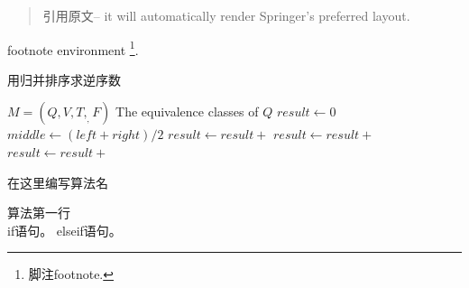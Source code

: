 \begin{quotation}
	引用原文-- it will automatically render Springer's preferred layout.
\end{quotation}

footnote environment \footnote{脚注footnote.}.

\begin{algorithm}  
	\caption{用归并排序求逆序数}  \label{key}
	\begin{algorithmic}[1] %
		\Require $M=(Q,V,T,_,F)$  
		\Ensure The equivalence classes of $Q$  
		\State $result \gets 0$  
		\State $middle \gets (left + right) / 2$  
		\State $result \gets result +$   
		\State $result \gets result +$   
		\State $result \gets result +$   
		\EndIf  
		\State {}  
		\EndFunction 
	\end{algorithmic}   
\end{algorithm}

\begin{algorithm}[!htbp]
	\caption{在这里编写算法名}
	\label{key}
	算法第一行\\
	 {
		 {
			if语句。
		}
		 {
			elseif语句。
		}
	}
\end{algorithm}


